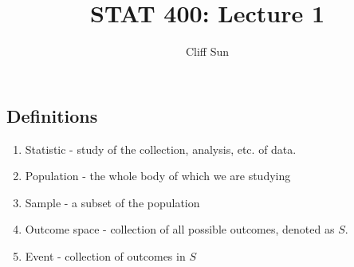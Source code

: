 \documentclass{article}
\title{STAT 400: Lecture 1}
\author{Cliff Sun}
\newtheorem{one minute paper}[theorem]{One Minute Paper}
\begin{document}
\maketitle
\subsection*{Definitions}
\begin{enumerate}
    \item Statistic - study of the collection, analysis, etc. of data. 
    \item Population - the whole body of which we are studying
    \item Sample - a subset of the population
    \item Outcome space - collection of all possible outcomes, denoted as $S$.
    \item Event - collection of outcomes in $S$
\end{enumerate}
\end{document}
